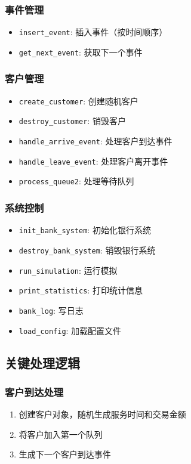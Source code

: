 \documentclass[12pt,a4paper]{article}
\begin{document}
\subsubsection{事件管理}
\begin{itemize}
\item \texttt{insert\_event}: 插入事件（按时间顺序）
\item \texttt{get\_next\_event}: 获取下一个事件
\end{itemize}

\subsubsection{客户管理}
\begin{itemize}
\item \texttt{create\_customer}: 创建随机客户
\item \texttt{destroy\_customer}: 销毁客户
\item \texttt{handle\_arrive\_event}: 处理客户到达事件
\item \texttt{handle\_leave\_event}: 处理客户离开事件
\item \texttt{process\_queue2}: 处理等待队列
\end{itemize}

\subsubsection{系统控制}
\begin{itemize}
\item \texttt{init\_bank\_system}: 初始化银行系统
\item \texttt{destroy\_bank\_system}: 销毁银行系统
\item \texttt{run\_simulation}: 运行模拟
\item \texttt{print\_statistics}: 打印统计信息
\item \texttt{bank\_log}: 写日志
\item \texttt{load\_config}: 加载配置文件
\end{itemize}

\subsection{关键处理逻辑}
\subsubsection{客户到达处理}
\begin{enumerate}
\item 创建客户对象，随机生成服务时间和交易金额
\item 将客户加入第一个队列
\item 生成下一个客户到达事件
\end{enumerate}
\end{document}
